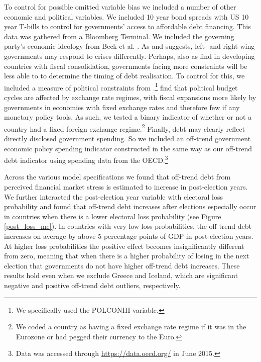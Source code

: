 \documentclass[]{article}
\begin{document}
To control for possible omitted variable bias we included a number of other economic and political variables. We included 10 year bond spreads with US 10 year T-bills to control for governments' access to affordable debt financing. This data was gathered from a Bloomberg Terminal.  We included the governing party's economic ideology from Beck et al. \citeyearpar[][updated through 2012]{DPI2001}. As \cite{broz2013} and \cite{ha2015} suggests, left- and right-wing governments may respond to crises differently. Perhaps, also as \cite{ha2015} find in developing countries with fiscal consolidation, governments facing more constraints will be less able to to determine the timing of debt realisation. To control for this, we included a measure of political constraints from \cite[][updated through 2011]{Henisz2004}.\footnote{We specifically used the POLCONIII variable.} \cite{hallerberg2000} find that political budget cycles are affected by exchange rate regimes, with fiscal expansions more likely by governments in economies with fixed exchange rates and therefore few if any monetary policy tools. As such, we tested a binary indicator of whether or not a country had a fixed foreign exchange regime.\footnote{We coded a country as having a fixed exchange rate regime if it was in the Eurozone or had pegged their currency to the Euro.} Finally, debt may clearly reflect directly disclosed government spending. So we included an off-trend government economic policy spending indicator constructed in the same way as our off-trend debt indicator using spending data from the OECD.\footnote{Data was accessed through \url{https://data.oecd.org/} in June 2015.}

Across the various model specifications we found that off-trend debt from perceived financial market stress is estimated to increase in post-election years. We further interacted the post-election year variable with electoral loss probability and found that off-trend debt increases after elections especially occur in countries when there is a lower electoral loss probability (see Figure \ref{post_loss_me}). In countries with very low loss probabilities, the off-trend debt increases on average by above 5 percentage points of GDP in post-election years. At higher loss probabilities the positive effect becomes insignificantly different from zero, meaning that when there is a higher probability of losing in the next election that governments do not have higher off-trend debt increases. These results hold even when we exclude Greece and Iceland, which are significant negative and positive off-trend debt outliers, respectively.
\end{document}
